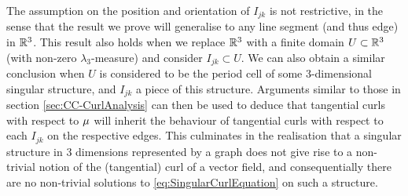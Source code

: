 The assumption on the position and orientation of $I_{jk}$ is not restrictive, in the sense that the result we prove will generalise to any line segment (and thus edge) in $\mathbb{R}^3$.
This result also holds when we replace $\mathbb{R}^3$ with a finite domain $U\subset\mathbb{R}^3$ (with non-zero $\lambda_3$-measure) and consider $I_{jk}\subset U$.
We can also obtain a similar conclusion when $U$ is considered to be the period cell of some 3-dimensional singular structure, and $I_{jk}$ a piece of this structure.
Arguments similar to those in section \ref{sec:CC-CurlAnalysis} can then be used to deduce that tangential curls with respect to $\mu$ will inherit the behaviour of tangential curls with respect to each $I_{jk}$ on the respective edges.
This culminates in the realisation that a singular structure in 3 dimensions represented by a graph does not give rise to a non-trivial notion of the (tangential) curl of a vector field, and consequentially there are no non-trivial solutions to \eqref{eq:SingularCurlEquation} on such a structure.

